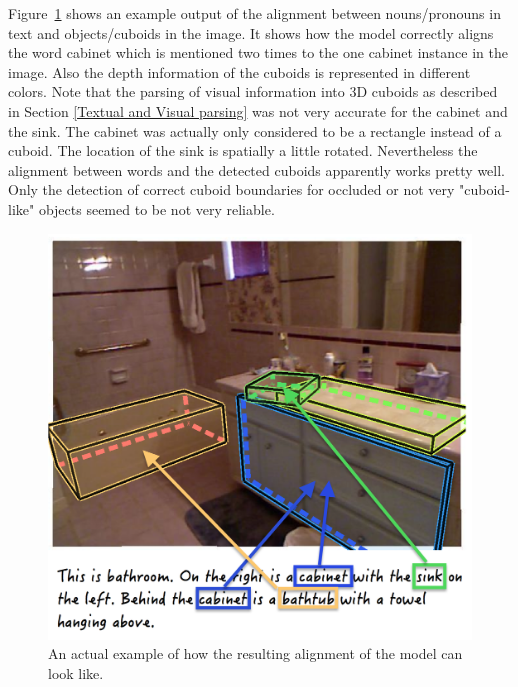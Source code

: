 \documentclass{utue} %
\begin{document}
Figure~\ref{fig:alignment_example} shows an example output of the alignment between nouns/pronouns in text and objects/cuboids in the image. It shows how the model correctly aligns the word cabinet which is mentioned two times to the one cabinet instance in the image. Also the depth information of the cuboids is represented in different colors. Note that the parsing of visual information into 3D cuboids as described in Section \ref{Textual and Visual parsing} was not very accurate for the cabinet and the sink. The cabinet was actually only considered to be a rectangle instead of a cuboid. The location of the sink is spatially a little rotated. Nevertheless the alignment between words and the detected cuboids apparently works pretty well. Only the detection of correct cuboid boundaries for occluded or not very "cuboid-like" objects seemed to be not very reliable.

\begin{figure}[h!]
  \centering
  \includegraphics[width=.9\columnwidth]{images/result_actual_example.png}
  \caption{\label{fig:alignment_example} An actual example of how the resulting alignment of the model can look like.}
\end{figure}
\end{document}
